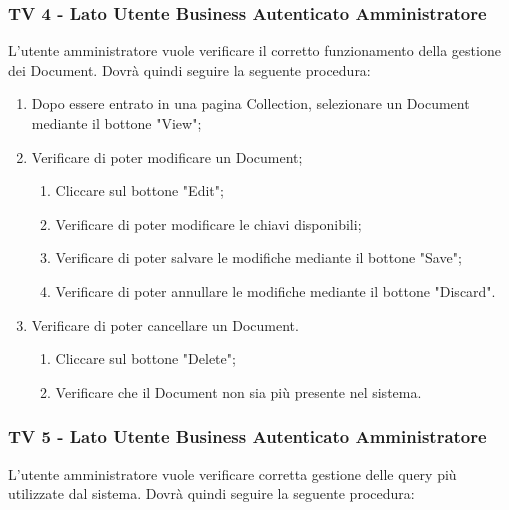 \subsubsection{TV 4 - Lato Utente Business Autenticato Amministratore}

L’utente amministratore vuole verificare il corretto funzionamento della gestione dei Document.
Dovrà quindi seguire la seguente procedura:


\begin{enumerate}
\item Dopo essere entrato in una pagina Collection, selezionare un Document mediante il bottone "View";
\item Verificare di poter modificare un Document;
\begin{enumerate}
\item Cliccare sul bottone "Edit";
\item Verificare di poter modificare le chiavi disponibili;
\item Verificare di poter salvare le modifiche mediante il bottone "Save";
\item Verificare di poter annullare le modifiche mediante il bottone "Discard".
\end{enumerate}
\item Verificare di poter cancellare un Document.
\begin{enumerate}
\item Cliccare sul bottone "Delete";
\item Verificare che il Document non sia più presente nel sistema.
\end{enumerate}
\end{enumerate}


\subsubsection{TV 5 - Lato Utente Business Autenticato Amministratore}
L’utente amministratore vuole verificare corretta gestione delle query più utilizzate dal sistema.
Dovrà quindi seguire la seguente procedura:

